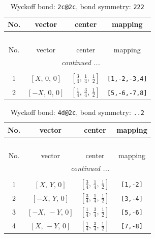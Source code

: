 \documentclass[fleqn,8pt]{jsarticle}
\begin{document}
\begin{longtable}{cccc}
\caption{Wyckoff bond: {\tt 2c@2c}, bond symmetry: {\tt 222}}
 \\
 \hline \hline
No. & vector & center & mapping \\ \hline \endfirsthead

\multicolumn{3}{l}{\tablename\ \thetable{}} \\
 \hline \hline
No. & vector & center & mapping \\ \hline \endhead

 \hline \hline
\multicolumn{3}{r}{\footnotesize\it continued ...} \\ \endfoot

 \hline \hline
\multicolumn{3}{r}{} \\ \endlastfoot

1 & $\left[ X,\, 0,\, 0 \right]$ & $\left[ \frac{3}{4},\, \frac{1}{4},\, \frac{1}{2} \right]$ & {\tt [1,-2,-3,4]} \\ \hline
2 & $\left[ - X,\, 0,\, 0 \right]$ & $\left[ \frac{1}{4},\, \frac{3}{4},\, \frac{1}{2} \right]$ & {\tt [5,-6,-7,8]} \\
\end{longtable}
\renewcommand{\arraystretch}{1.2}
\begin{longtable}{cccc}
\caption{Wyckoff bond: {\tt 4d@2c}, bond symmetry: {\tt ..2}}
 \\
 \hline \hline
No. & vector & center & mapping \\ \hline \endfirsthead

\multicolumn{3}{l}{\tablename\ \thetable{}} \\
 \hline \hline
No. & vector & center & mapping \\ \hline \endhead

 \hline \hline
\multicolumn{3}{r}{\footnotesize\it continued ...} \\ \endfoot

 \hline \hline
\multicolumn{3}{r}{} \\ \endlastfoot

1 & $\left[ X,\, Y,\, 0 \right]$ & $\left[ \frac{3}{4},\, \frac{1}{4},\, \frac{1}{2} \right]$ & {\tt [1,-2]} \\ \hline
2 & $\left[ - X,\, Y,\, 0 \right]$ & $\left[ \frac{3}{4},\, \frac{1}{4},\, \frac{1}{2} \right]$ & {\tt [3,-4]} \\ \hline
3 & $\left[ - X,\, - Y,\, 0 \right]$ & $\left[ \frac{1}{4},\, \frac{3}{4},\, \frac{1}{2} \right]$ & {\tt [5,-6]} \\ \hline
4 & $\left[ X,\, - Y,\, 0 \right]$ & $\left[ \frac{1}{4},\, \frac{3}{4},\, \frac{1}{2} \right]$ & {\tt [7,-8]} \\
\end{longtable}
\end{document}
